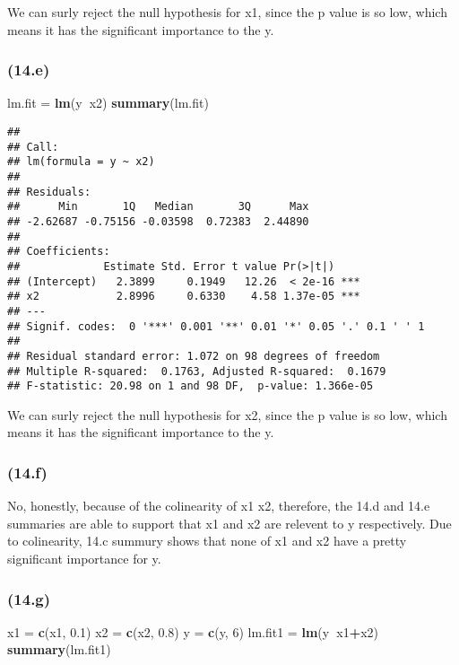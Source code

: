 \documentclass[]{article}
\newenvironment{Shaded}{\begin{snugshade}}{\end{snugshade}}
\newcommand{\DecValTok}[1]{\textcolor[rgb]{0.00,0.00,0.81}{#1}}
\newcommand{\FloatTok}[1]{\textcolor[rgb]{0.00,0.00,0.81}{#1}}
\newcommand{\KeywordTok}[1]{\textcolor[rgb]{0.13,0.29,0.53}{\textbf{#1}}}
\newcommand{\NormalTok}[1]{#1}
\newcommand{\OperatorTok}[1]{\textcolor[rgb]{0.81,0.36,0.00}{\textbf{#1}}}
\newcommand{\StringTok}[1]{\textcolor[rgb]{0.31,0.60,0.02}{#1}}
\begin{document}
We can surly reject the null hypothesis for x1, since the p value is so
low, which means it has the significant importance to the y.

\hypertarget{e-2}{%
\subsubsection{(14.e)}\label{e-2}}

\begin{Shaded}
\begin{Highlighting}[]
\NormalTok{lm.fit =}\StringTok{ }\KeywordTok{lm}\NormalTok{(y}\OperatorTok{~}\NormalTok{x2)}
\KeywordTok{summary}\NormalTok{(lm.fit)}
\end{Highlighting}
\end{Shaded}

\begin{verbatim}
## 
## Call:
## lm(formula = y ~ x2)
## 
## Residuals:
##      Min       1Q   Median       3Q      Max 
## -2.62687 -0.75156 -0.03598  0.72383  2.44890 
## 
## Coefficients:
##             Estimate Std. Error t value Pr(>|t|)    
## (Intercept)   2.3899     0.1949   12.26  < 2e-16 ***
## x2            2.8996     0.6330    4.58 1.37e-05 ***
## ---
## Signif. codes:  0 '***' 0.001 '**' 0.01 '*' 0.05 '.' 0.1 ' ' 1
## 
## Residual standard error: 1.072 on 98 degrees of freedom
## Multiple R-squared:  0.1763, Adjusted R-squared:  0.1679 
## F-statistic: 20.98 on 1 and 98 DF,  p-value: 1.366e-05
\end{verbatim}

We can surly reject the null hypothesis for x2, since the p value is so
low, which means it has the significant importance to the y.

\hypertarget{f}{%
\subsubsection{(14.f)}\label{f}}

No, honestly, because of the colinearity of x1 x2, therefore, the 14.d
and 14.e summaries are able to support that x1 and x2 are relevent to y
respectively. Due to colinearity, 14.c summury shows that none of x1 and
x2 have a pretty significant importance for y.

\hypertarget{g}{%
\subsubsection{(14.g)}\label{g}}

\begin{Shaded}
\begin{Highlighting}[]
\NormalTok{x1 =}\StringTok{ }\KeywordTok{c}\NormalTok{(x1, }\FloatTok{0.1}\NormalTok{)}
\NormalTok{x2 =}\StringTok{ }\KeywordTok{c}\NormalTok{(x2, }\FloatTok{0.8}\NormalTok{)}
\NormalTok{y =}\StringTok{ }\KeywordTok{c}\NormalTok{(y, }\DecValTok{6}\NormalTok{)}
\NormalTok{lm.fit1 =}\StringTok{ }\KeywordTok{lm}\NormalTok{(y}\OperatorTok{~}\NormalTok{x1}\OperatorTok{+}\NormalTok{x2)}
\KeywordTok{summary}\NormalTok{(lm.fit1)}
\end{Highlighting}
\end{Shaded}
\end{document}

